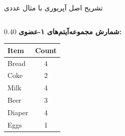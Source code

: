 \begin{frame}{تشریح اصل آپریوری با مثال عددی}{}
\begin{columns}[T,onlytextwidth]
\begin{column}{0.40\textwidth}
\vspace{0.3cm}
\textbf{\small شمارش مجموعه‌آیتم‌های ۱-عضوی:}\\[2pt]
\begin{latin}
\fontsize{7.5}{9.5}\selectfont
\begin{tabular}{|l|c|}
\hline
\rowcolor{mannheimblue!15}\textbf{Item} & \textbf{Count} \\ \hline
Bread & 4 \\ \hline
\rowcolor{black!15}Coke & 2 \\ \hline
Milk & 4 \\ \hline
Beer & 3 \\ \hline
Diaper & 4 \\ \hline
\rowcolor{black!15}Eggs & 1 \\ \hline
\end{tabular}
\end{latin}
\end{column}
\end{columns}
\end{frame}
